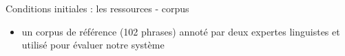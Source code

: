 \documentclass[french]{beamer}
\begin{document}
\begin{frame}{Conditions initiales : les ressources - corpus} 
  \begin{itemize}
  \item un corpus de référence (102 phrases) annoté par deux expertes linguistes et utilisé pour évaluer notre système\\
    \vspace{-0.3cm}
    \begin{table}[]
      \centering
    \end{table}
    

\end{itemize}
\end{frame}
\end{document}
